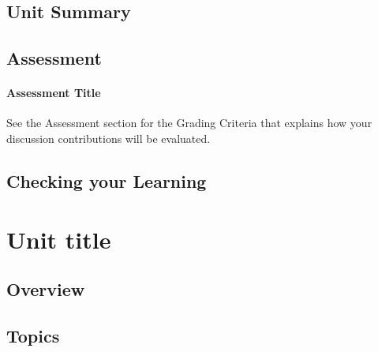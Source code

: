 \documentclass[
]{book}
\begin{document}
\hypertarget{unit-summary}{%
\section*{Unit Summary}\label{unit-summary}}

\hypertarget{assessment-1}{%
\section*{Assessment}\label{assessment-1}}

\begin{assessment}
\hypertarget{assessment-title}{%
\subsubsection*{Assessment Title}\label{assessment-title}}

See the Assessment section for the Grading Criteria that explains how
your discussion contributions will be evaluated.
\end{assessment}

\hypertarget{checking-your-learning-1}{%
\section*{Checking your Learning}\label{checking-your-learning-1}}

\begin{progress}

\end{progress}

\hypertarget{unit-title-2}{%
\chapter{Unit title}\label{unit-title-2}}

\hypertarget{overview-2}{%
\section*{Overview}\label{overview-2}}

\hypertarget{topics-2}{%
\section*{Topics}\label{topics-2}}
\end{document}
